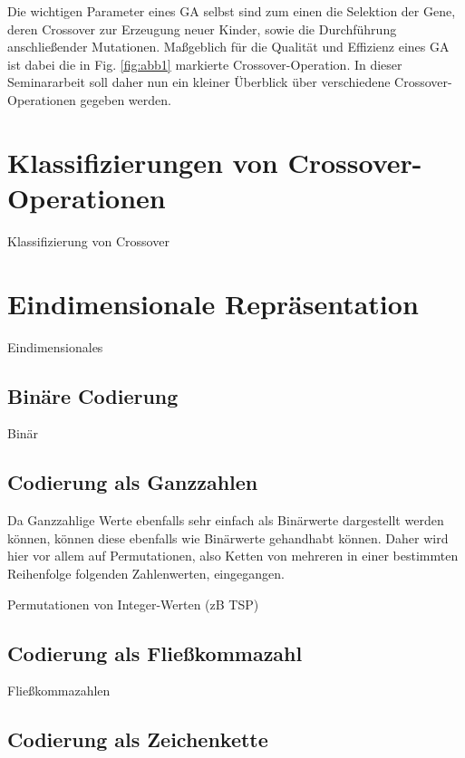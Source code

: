 \documentclass{llncs}
\begin{document}
	Die wichtigen Parameter eines GA selbst sind zum einen die Selektion der Gene, deren Crossover zur Erzeugung neuer Kinder, sowie die Durchführung anschließender Mutationen. Maßgeblich für die Qualität und Effizienz eines GA ist dabei die in Fig. \ref{fig:abb1} markierte Crossover-Operation. In dieser Seminararbeit soll daher nun ein kleiner Überblick über verschiedene Crossover-Operationen gegeben werden.

\section{Klassifizierungen von Crossover-Operationen}
\label{sec:KlassifizierungCrossover}

Klassifizierung von Crossover

\section{Eindimensionale Repräsentation}
\label{sec:EindimensionaleRep}

Eindimensionales

\subsection{Binäre Codierung}
\label{sec:BinCod}

Binär

\subsection{Codierung als Ganzzahlen}
\label{sec:IntCod}

Da Ganzzahlige Werte ebenfalls sehr einfach als Binärwerte dargestellt werden können, können diese ebenfalls wie Binärwerte gehandhabt können. Daher wird hier vor allem auf Permutationen, also Ketten von mehreren in einer bestimmten Reihenfolge folgenden Zahlenwerten, eingegangen.

Permutationen von Integer-Werten (zB TSP)

\subsection{Codierung als Fließkommazahl}
\label{sec:FloatCod}

Fließkommazahlen

\subsection{Codierung als Zeichenkette}
\label{sec:StrCod}
\end{document}
